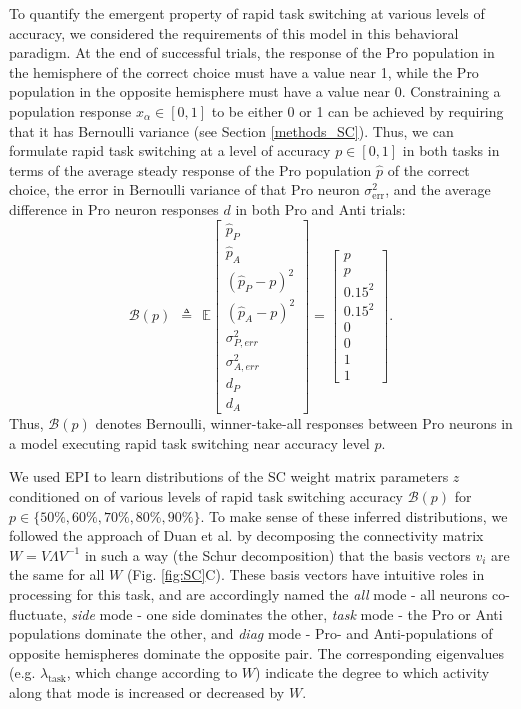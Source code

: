 \documentclass[11pt]{article}
\begin{document}
To quantify the emergent property of rapid task switching at various levels of accuracy, we considered the requirements of this model in this behavioral paradigm.
At the end of successful trials, the response of the Pro population in the hemisphere of the correct choice must have a value near 1, while the Pro population in the opposite hemisphere must have a value near 0.
Constraining a population response $x_\alpha \in \left[0,1\right]$ to be either 0 or 1 can be achieved by requiring that it has Bernoulli variance (see Section \ref{methods_SC}).
Thus, we can formulate rapid task switching at a level of accuracy $p \in \left[0, 1\right]$ in both tasks in terms of the average steady response of the Pro population $\hat{p}$ of the correct choice,  the error in Bernoulli variance of that Pro neuron $\sigma^2_{\text{err}}$, and the average difference in Pro neuron responses $d$ in both Pro and Anti trials:
\begin{equation}
\mathcal{B}(p) ~~\triangleq~~ \mathbb{E}\begin{bmatrix} \hat{p}_P \\ \hat{p}_A \\ (\hat{p}_P-p)^2 \\ (\hat{p}_A - p)^2 \\ \sigma^2_{P,err} \\ \sigma^2_{A,err} \\ d_P \\ d_A \end{bmatrix} = \begin{bmatrix} p \\ p \\ 0.15^2 \\ 0.15^2 \\ 0 \\ 0 \\ 1 \\ 1 \end{bmatrix}.
\end{equation}
Thus, $\mathcal{B}(p)$ denotes Bernoulli, winner-take-all responses between Pro neurons in a model executing rapid task switching near accuracy level $p$.

We used EPI to learn distributions of the SC weight matrix parameters $z$ conditioned on of various levels of rapid task switching accuracy $\mathcal{B}(p)$ for $p \in \{50\%, 60\%, 70\%, 80\%, 90\%\}$.
To make sense of these inferred distributions, we followed the approach of Duan et al. by decomposing the connectivity matrix $W = V\Lambda V^{-1}$ in such a way (the Schur decomposition) that the basis vectors $v_i$ are the same for all $W$ (Fig. \ref{fig:SC}C). These basis vectors have intuitive roles in processing for this task, and are accordingly named the \textit{all} mode - all neurons co-fluctuate, \textit{side} mode - one side dominates the other, \textit{task} mode - the Pro or Anti populations dominate the other, and \textit{diag} mode - Pro- and Anti-populations of opposite hemispheres dominate the opposite pair. 
The corresponding eigenvalues (e.g. $\lambda_{\text{task}}$, which change according to $W$) indicate the degree to which activity along that mode is increased or decreased by $W$. 
\end{document}
